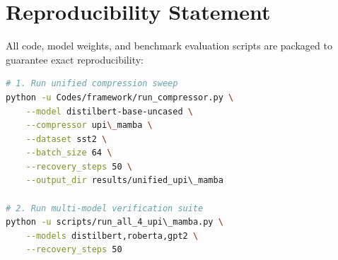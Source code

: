 \section{Reproducibility Statement}
All code, model weights, and benchmark evaluation scripts are packaged to guarantee exact reproducibility:
\begin{lstlisting}[language=bash]
# 1. Run unified compression sweep
python -u Codes/framework/run_compressor.py \
    --model distilbert-base-uncased \
    --compressor upi\_mamba \
    --dataset sst2 \
    --batch_size 64 \
    --recovery_steps 50 \
    --output_dir results/unified_upi\_mamba

# 2. Run multi-model verification suite
python -u scripts/run_all_4_upi\_mamba.py \
    --models distilbert,roberta,gpt2 \
    --recovery_steps 50
\end{lstlisting}
